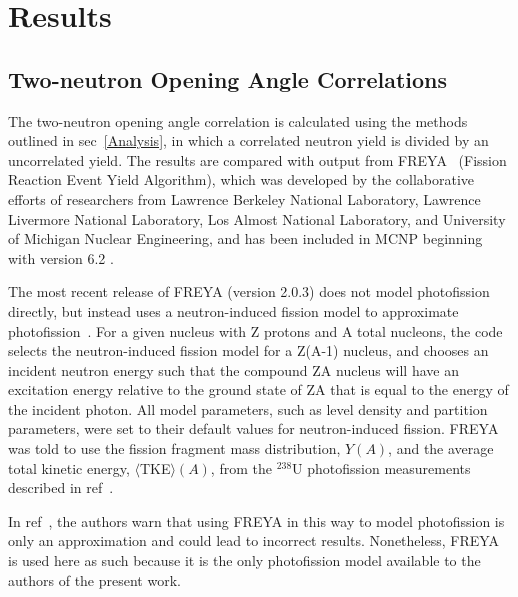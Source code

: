 \chapter{Results}
\section{Two-neutron Opening Angle Correlations}
The two-neutron opening angle correlation is calculated using the methods outlined in sec~\ref{Analysis}, in which a correlated neutron yield is divided by an uncorrelated yield.
The results are compared with output from FREYA~\cite{FREYA} (Fission Reaction Event Yield Algorithm), which was developed by the collaborative efforts of researchers from Lawrence Berkeley National Laboratory,  Lawrence Livermore National Laboratory, Los Almost National Laboratory, and University of Michigan Nuclear Engineering, and has been included in MCNP beginning with version 6.2 .
 
The most recent release of FREYA (version 2.0.3) does not model photofission directly, but instead uses a neutron-induced fission model to approximate photofission~\cite{FREYA_photofission}.
For a given nucleus with Z protons and A total nucleons, the code selects the neutron-induced fission model for a Z(A-1) nucleus, and chooses an incident neutron energy such that the compound ZA nucleus will have an excitation energy relative to the ground state of ZA that is equal to the energy of the incident photon.
All model parameters, such as level density and partition parameters, were set to their default values for neutron-induced fission.
FREYA was told to use the fission fragment mass distribution, $Y(A)$, and the average total kinetic energy, $\langle$TKE$\rangle(A)$, from the $^{238}$U photofission measurements described in ref~\cite{2017Krishichayan}.

In ref~\cite{Talou2018}, the authors warn that using FREYA in this way to model photofission is only an approximation and could lead to incorrect results.
Nonetheless, FREYA is used here as such because it is the only photofission model available to the authors of the present work.

